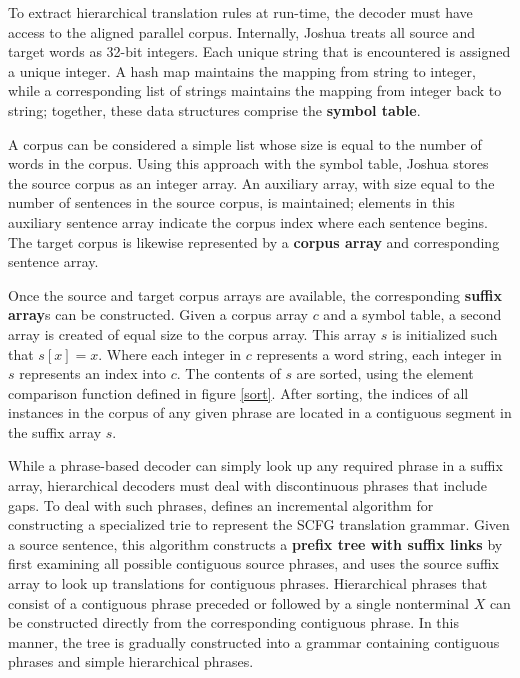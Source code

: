 \documentclass{pbml}
\begin{document}
To extract hierarchical translation rules at run-time, the decoder must have access to the aligned parallel corpus. Internally, Joshua treats all source and target words as 32-bit integers. Each unique string that is encountered is assigned a unique integer. A hash map maintains the mapping from string to integer, while a corresponding list of strings maintains the mapping from integer back to string; together, these data structures comprise the {\bf symbol table}.

A corpus can be considered a simple list whose size is equal to the number of words in the corpus. Using this approach with the symbol table, Joshua stores the source corpus as an integer array. An auxiliary array, with size equal to the number of sentences in the source corpus, is maintained; elements in this auxiliary sentence array indicate the corpus index where each sentence begins. The target corpus is likewise represented by a {\bf corpus array} and corresponding sentence array.

Once the source and target corpus arrays are available, the corresponding {\bf suffix array}s can be constructed. Given a corpus array $c$ and a symbol table, a second array is created of equal size to the corpus array. This array $s$ is initialized such that $s[x] = x$. Where each integer in $c$ represents a word string, each integer in $s$ represents an index into $c$. The contents of $s$ are sorted, using the element comparison function defined in figure \ref{sort}. After sorting, the indices of all instances in the corpus of any given phrase are located in a contiguous segment in the suffix array $s$.

While a phrase-based decoder can simply look up any required phrase in a suffix array, hierarchical decoders must deal with discontinuous phrases that include gaps. To deal with such phrases,  defines an incremental algorithm for constructing a specialized trie \cite{Fredkin1960} to represent the SCFG translation grammar. Given a source sentence, this algorithm constructs a {\bf prefix tree with suffix links} by first examining all possible contiguous source phrases, and uses the source suffix array to look up translations for contiguous phrases. Hierarchical phrases that consist of a contiguous phrase preceded or followed by a single nonterminal $X$ can be constructed directly from the corresponding contiguous phrase. In this manner, the tree is gradually constructed into a grammar containing contiguous phrases and simple hierarchical phrases. 
\end{document}
